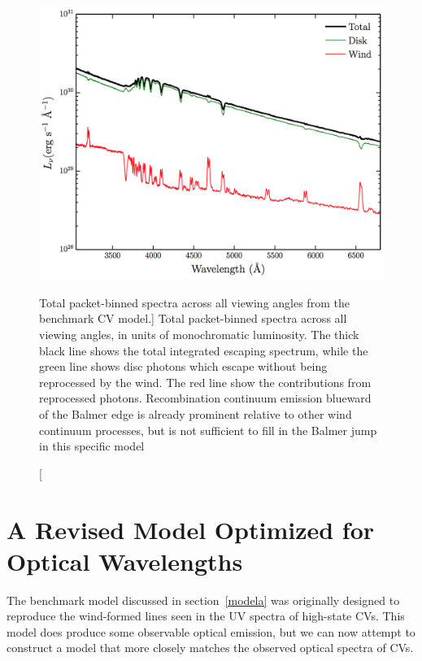 \begin{figure} 
\centering
\includegraphics[width=1.0\textwidth]{figures/05-cvpaper/modela_escaping.png}
\caption
[Total packet-binned spectra across all viewing angles from the benchmark CV model.]
{Total packet-binned spectra across all viewing angles, in units
of monochromatic luminosity.
The thick black line shows the total 
integrated escaping spectrum, 
while the green line shows disc photons which escape without being reprocessed by
the wind. The red line show the contributions from reprocessed photons. 
Recombination continuum emission blueward of the Balmer 
edge is already prominent relative to other wind continuum processes, but is not sufficient
to fill in the Balmer jump in this specific model}
\label{cont}
\end{figure} 


\newpage



%
%

\section{A Revised Model Optimized for Optical Wavelengths}

The benchmark model discussed in section~\ref{modela} was originally
designed to reproduce the wind-formed lines seen in the UV spectra of
high-state CVs. This model does produce some observable
optical emission, but we can now attempt to construct a model that more closely 
matches the observed optical spectra of CVs. 

